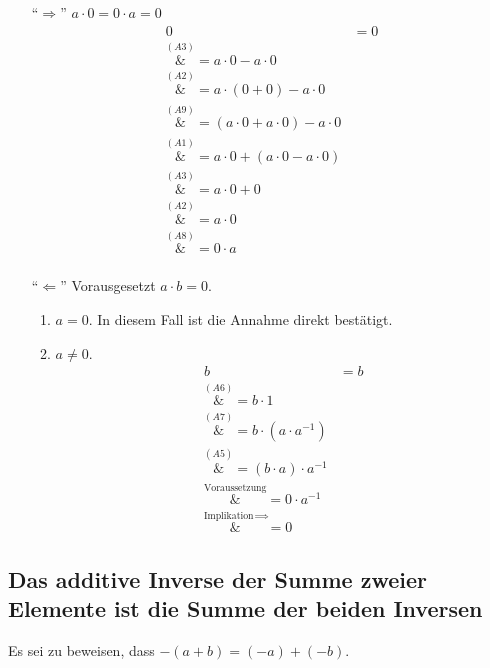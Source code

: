 \documentclass{article}
\begin{document}
\begin{itemize}
\item[``$\Rightarrow$''] $a \cdot 0 = 0 \cdot a =  0$
  \label{ab0:right}
  \begin{align*}
    0 &= 0 \\
      \overset{\hyperref[a3]{(A3)}}&= a \cdot 0 - a \cdot 0 \\
      \overset{\hyperref[a2]{(A2)}}&= a \cdot (0 + 0) - a \cdot 0 \\
      \overset{\hyperref[a9]{(A9)}}&= (a \cdot 0 + a \cdot 0) - a \cdot 0 \\
      \overset{\hyperref[a1]{(A1)}}&= a \cdot 0 + (a \cdot 0 - a \cdot 0) \\
      \overset{\hyperref[a3]{(A3)}}&= a \cdot 0 + 0 \\
      \overset{\hyperref[a2]{(A2)}}&= a \cdot 0 \\
      \overset{\hyperref[a8]{(A8)}}&= 0 \cdot a \\
  \end{align*}
\item[``$\Leftarrow$'']
  Vorausgesetzt $a \cdot b = 0$.

  \begin{enumerate}[label=\textbf{\arabic*. Fall}]
  \item $a = 0$. In diesem Fall ist die Annahme direkt bestätigt.
  \item $a \ne 0$.
    \begin{align*}
      b &= b \\
      \overset{\hyperref[a6]{(A6)}}&= b \cdot 1 \\
      \overset{\hyperref[a7]{(A7)}}&= b \cdot (a \cdot a^{-1})  \\      
      \overset{\hyperref[a5]{(A5)}}&= (b \cdot a) \cdot a^{-1}  \\
      \overset{\text{Voraussetzung}}&= 0 \cdot a^{-1}  \\
      \overset{\hyperref[ab0:right]{\text{Implikation }\Rightarrow}}&= 0 
    \end{align*}
  \end{enumerate}
\end{itemize}

\subsection{Das additive Inverse der Summe zweier Elemente ist die Summe der beiden Inversen}

Es sei zu beweisen, dass $-(a + b) = (-a) + (-b)$.
\end{document}
